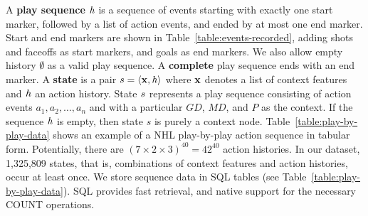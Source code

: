 \documentclass[]{article}
\begin{document}
A \textbf{play sequence} $\it{h}$ is a sequence of events starting with exactly one start marker, followed by a list of action events, and ended by at most one end marker.  Start and end markers are shown in Table~\ref{table:events-recorded}, adding shots and faceoffs as start markers, and goals as end markers. We also allow empty history $\emptyset$ as a valid play sequence. A \textbf{complete} play sequence ends with an end marker.
A \textbf{state} is a pair $s = \langle \mathbf{x}, \it{h} \rangle$ where $\mathbf{x}$ denotes a list of context features and $\it{h}$ an action history. State $s$ represents a play sequence consisting of action events $a_1,a_2,\ldots,a_n$ and with a particular $GD$, $MD$, and $P$ as the context. If the sequence $\it{h}$ is empty, then state $s$ is purely a context node. Table~\ref{table:play-by-play-data} shows an example of a NHL play-by-play action sequence in tabular form. Potentially, there are $(7 \times 2 \times 3)^{40} = 42^{40}$ action histories. In our dataset, 1,325,809 states, that is, combinations of context features and action histories, occur at least once. %
We store sequence data in SQL tables (see Table~\ref{table:play-by-play-data}). SQL provides fast retrieval,  and  native support for the necessary COUNT operations.

\begin{table}[htb]
\caption{Sample Play-By-Play Data in Tabular Format}
\label{table:play-by-play-data}
\begin{center}
\end{center}
\end{table}
\end{document}
